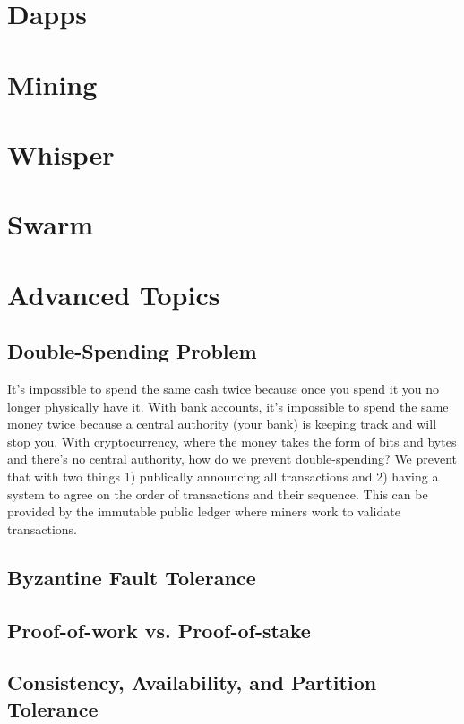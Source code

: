 \documentclass{article}
\begin{document}
\section{Dapps}

\section{Mining}

\section{Whisper}

\section{Swarm}

\section{Advanced Topics}

\subsection{Double-Spending Problem}
It's impossible to spend the same cash twice because once you spend it you no longer physically have it. With bank accounts, it's impossible to spend the same money twice because a central authority (your bank) is keeping track and will stop you. With
cryptocurrency, where the money takes the form of bits and bytes and there's no central authority, how do we prevent double-spending? We prevent that with two things 1) publically announcing all transactions and 2) having a system to agree on the order
of transactions and their sequence. This can be provided by the immutable public ledger where miners work to validate transactions.

\subsection{Byzantine Fault Tolerance}

\subsection{Proof-of-work vs. Proof-of-stake}

\subsection{Consistency, Availability, and Partition Tolerance}
\end{document}

